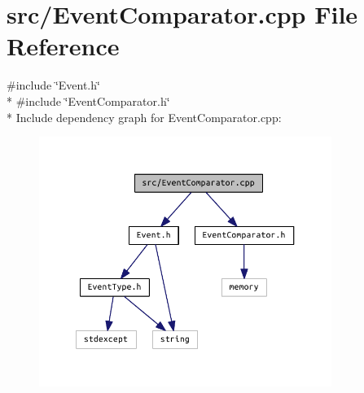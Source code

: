 \section{src/\+Event\+Comparator.cpp File Reference}
\label{_event_comparator_8cpp}
{\ttfamily \#include \char`\"{}Event.\+h\char`\"{}}\\*
{\ttfamily \#include \char`\"{}Event\+Comparator.\+h\char`\"{}}\\*
Include dependency graph for Event\+Comparator.\+cpp\+:
\nopagebreak
\begin{figure}[H]
\begin{center}
\leavevmode
\includegraphics[width=269pt]{_event_comparator_8cpp__incl}
\end{center}
\end{figure}
